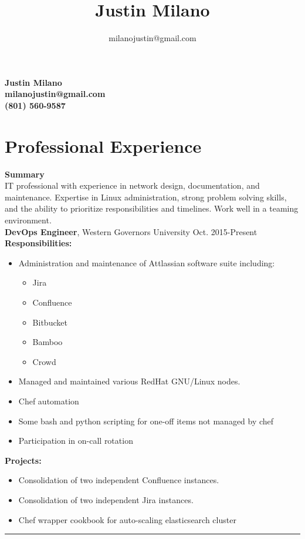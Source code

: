 \documentclass[10pt]{article}
\title{\bfseries\Huge Justin Milano}
\author{milanojustin@gmail.com}
\date{}
\newenvironment{myitemize}
{ \begin{itemize}[topsep=0pt]
    \vspace{-4pt}
    \setlength{\itemsep}{0pt}
    \setlength{\parskip}{0pt}
    \setlength{\parsep}{0pt}     }
{ \end{itemize}                  }
\newcommand{\breakrule}{
    \color{lightgray}
    \vspace{-4pt}
  \begin{center}
    \noindent\rule{7cm}{0.5pt}
  \end{center}
  }
\begin{document}
\begin{center}
  {\bf \Huge Justin Milano}\\
  \vspace{5pt}
  {\bf \large milanojustin@gmail.com}\\
  {\bf \large (801) 560-9587}
\end{center}
\vspace{-5pt}
\section*{Professional Experience}

\noindent
{\large {\bf Summary}} \\
IT professional with experience in network design, documentation, and maintenance. Expertise in Linux administration, strong problem solving skills, and the ability to prioritize responsibilities and timelines. Work well in a teaming environment. \\

\noindent
{\large {\bf DevOps Engineer}, Western Governors University \hfill Oct. 2015-Present } \\
{\bf Responsibilities:}
\begin{myitemize}
  \item Administration and maintenance of Attlassian software suite including:
    \begin{myitemize}
      \item Jira
      \item Confluence
      \item Bitbucket
      \item Bamboo
      \item Crowd
    \end{myitemize}
  \item Managed and maintained various RedHat GNU/Linux nodes.
  \item Chef automation
  \item Some bash and python scripting for one-off items not managed by chef
  \item Participation in on-call rotation
\end{myitemize} 
{\bf Projects:}
\begin{myitemize}
  \item Consolidation of two independent Confluence instances.
  \item Consolidation of two independent Jira instances.
  \item Chef wrapper cookbook for auto-scaling elasticsearch cluster
\end{myitemize} 
{\breakrule}
\end{document}

